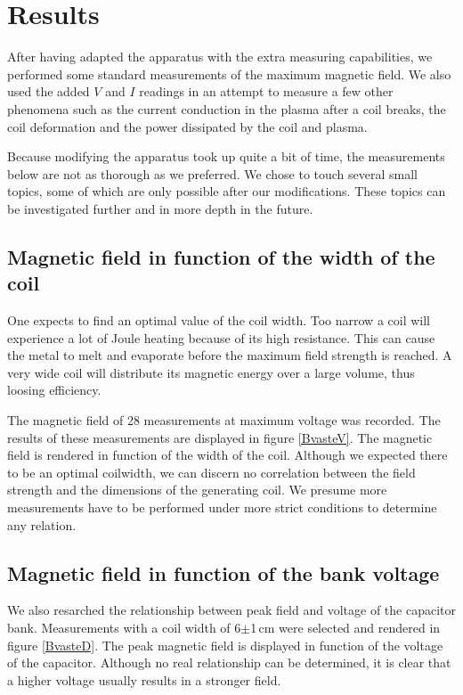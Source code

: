 \section{Results}

After having adapted the apparatus with the extra measuring capabilities, 
we performed some standard measurements of the maximum magnetic field. We 
also used the added $V$ and $I$ readings in an attempt to measure a few 
other phenomena such as the current conduction in the plasma after a coil 
breaks, the coil deformation and the power dissipated by the coil and 
plasma.

Because modifying the apparatus took up quite a bit of time, the 
measurements below are not as thorough as we preferred. We chose to touch 
several small topics, some of which are only possible after our 
modifications. These topics can be investigated further and in more depth 
in the future.


\subsection{Magnetic field in function of the width of the coil}

One expects to find an optimal value of the coil width. Too narrow a coil 
will experience a lot of Joule heating because of its high resistance. This 
can cause the metal to melt and evaporate before the maximum field strength 
is reached. A very wide coil will distribute its magnetic energy over a 
large volume, thus loosing efficiency.

The magnetic field of 28 measurements at maximum voltage was recorded. The 
results of these measurements are displayed in figure \ref{BvasteV}. The 
magnetic field is rendered in function of the width of the coil. Although 
we expected there to be an optimal coilwidth, we can discern no correlation 
between the field strength and the dimensions of the generating coil. We 
presume more measurements have to be performed under more strict conditions 
to determine any relation.



\subsection{Magnetic field in function of the bank voltage}

We also resarched the relationship between peak field and voltage of the 
capacitor bank. Measurements with a coil width of 6$\pm$1\,cm were selected and 
rendered in figure \ref{BvasteD}. The peak magnetic field is displayed in 
function of the voltage of the capacitor. Although no real relationship can be 
determined, it is clear that a higher voltage usually results in a stronger 
field.

